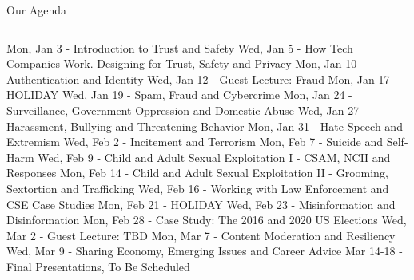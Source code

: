 \documentclass[nobackground,dvipsnames,table]{beamer}
\begin{document}
\begin{frame}{Our Agenda}
    \begin{columns}
                    \footnotesize
                    Mon, Jan 3 - Introduction to Trust and Safety \newline
                    Wed, Jan 5 - How Tech Companies Work. Designing for Trust, Safety and Privacy \newline
                    Mon, Jan 10 - Authentication and Identity \newline
                    Wed, Jan 12 - Guest Lecture: Fraud \newline
                    Mon, Jan 17 - HOLIDAY \newline
                    Wed, Jan 19 - Spam, Fraud and Cybercrime \newline
                    Mon, Jan 24 - Surveillance, Government Oppression and Domestic Abuse \newline
                    Wed, Jan 27 - Harassment, Bullying and Threatening Behavior \newline
                    Mon, Jan 31 - Hate Speech and Extremism  \newline
                    Wed, Feb 2 - Incitement and Terrorism \newline
                    Mon, Feb 7 - Suicide and Self-Harm \newline
                    Wed, Feb 9 - Child and Adult Sexual Exploitation I - CSAM, NCII and Responses \newline
                    \footnotesize
                    Mon, Feb 14 - Child and Adult Sexual Exploitation II - Grooming, Sextortion and Trafficking \newline
                    Wed, Feb 16 - Working with Law Enforcement and CSE Case Studies \newline
                    Mon, Feb 21 - HOLIDAY \newline
                    Wed, Feb 23 - Misinformation and Disinformation \newline
                    Mon, Feb 28 - Case Study: The 2016 and 2020 US Elections \newline
                    Wed, Mar 2 - Guest Lecture: TBD \newline
                    Mon, Mar 7 - Content Moderation and Resiliency \newline 
                    Wed, Mar 9 - Sharing Economy, Emerging Issues and Career Advice \newline
                    Mar 14-18 - Final Presentations, To Be Scheduled \newline
        \end{columns}
\end{frame}
\end{document}
